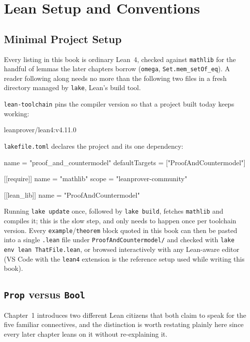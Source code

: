 \appendix
\chapter{Lean Setup and Conventions}
\label{app:lean-setup}

\section{Minimal Project Setup}

Every listing in this book is ordinary Lean~4, checked against
\texttt{mathlib} for the handful of lemmas the later chapters borrow
(\texttt{omega}, \texttt{Set.mem\_setOf\_eq}). A reader following
along needs no more than the following two files in a fresh
directory managed by \texttt{lake}, Lean's build tool.

\texttt{lean-toolchain} pins the compiler version so that a project
built today keeps working:
\begin{lean}
leanprover/lean4:v4.11.0
\end{lean}

\texttt{lakefile.toml} declares the project and its one dependency:
\begin{lean}
name = "proof_and_countermodel"
defaultTargets = ["ProofAndCountermodel"]

[[require]]
name = "mathlib"
scope = "leanprover-community"

[[lean_lib]]
name = "ProofAndCountermodel"
\end{lean}
Running \texttt{lake update} once, followed by \texttt{lake build},
fetches \texttt{mathlib} and compiles it; this is the slow step, and
only needs to happen once per toolchain version. Every
\texttt{example}/\texttt{theorem} block quoted in this book can then
be pasted into a single \texttt{.lean} file under
\texttt{ProofAndCountermodel/} and checked with
\texttt{lake env lean ThatFile.lean}, or browsed interactively with
any Lean-aware editor (VS Code with the \texttt{lean4} extension is
the reference setup used while writing this book).

\section{\texttt{Prop} versus \texttt{Bool}}

Chapter~1 introduces two different Lean citizens that both claim to
speak for the five familiar connectives, and the distinction is worth
restating plainly here since every later chapter leans on it without
re-explaining it.

